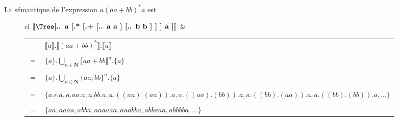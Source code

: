 \begin{example}
La sémantique de l'expression $a(aa+bb)^*a$ est
\begin{figure}[h]
\hspace{-2cm}
\begin{tabular}{cl}
$\mt{\Tree[.{.} a [.{*} [.{+} [.{.} a a ] [.{.} b b ] ] ] a ]}$ &
\begin{tabular}{ll}
$=$& $\llbracket a \rrbracket . \llbracket (aa+bb)^* \rrbracket . \llbracket a \rrbracket$ \\ & \\ $=$ & $\{a\} . \bigcup_{n \in \mathbf{N}} \llbracket aa+bb \rrbracket^n . \{a\}$ \\ & \\ $=$ & $\{a\} . \bigcup_{n \in \mathbf{N}} \{aa,bb\}^n . \{a\}$ \\ 
& \\
$=$ & $\{a.\epsilon.a, a.aa.a, a.bb.a, a.((aa).(aa)).a, a.((aa).(bb)).a, a.((bb).(aa)).a, a.((bb).(bb)).a, ...\}$ \\
&\\
$=$ & $\{aa, aaaa, abba, aaaaaa, aaabba, abbaaa, abbbba, ...\}$
\end{tabular} \end{tabular}
\end{figure}
\end{example}
